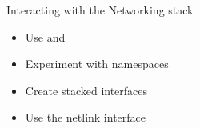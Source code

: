 \setuplabframe
{Interacting with the Networking stack}
{
  \begin{itemize}
  \item Use  and 
  \item Experiment with namespaces
  \item Create stacked interfaces
  \item Use the netlink interface
  \end{itemize}
}
